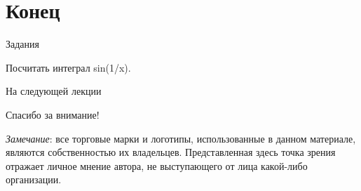 \section*{Конец}

\begin{frame}{Задания}

Посчитать интеграл sin(1/x).

\end{frame}

\begin{frame}{На следующей лекции}
\end{frame}

\begin{frame}

{\huge{Спасибо за внимание!}\par}

\vfill

\tiny{\textit{Замечание}: все торговые марки и логотипы, использованные в данном материале, являются собственностью их владельцев. Представленная здесь точка зрения отражает личное мнение автора, не выступающего от лица какой-либо организации.}

\end{frame}


